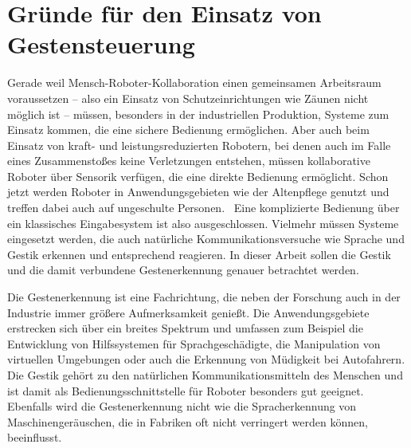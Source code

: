 \section{Gründe für den Einsatz von Gestensteuerung}
Gerade weil Mensch-Roboter-Kollaboration einen gemeinsamen Arbeitsraum voraussetzen -- also ein Einsatz von Schutzeinrichtungen wie Zäunen nicht möglich ist -- müssen, besonders in der industriellen Produktion, Systeme zum Einsatz kommen, die eine sichere Bedienung ermöglichen. Aber auch beim Einsatz von kraft- und leistungsreduzierten Robotern, bei denen auch im Falle eines Zusammenstoßes keine Verletzungen entstehen, müssen kollaborative Roboter über Sensorik verfügen, die eine direkte Bedienung ermöglicht. Schon jetzt werden Roboter in Anwendungsgebieten wie der Altenpflege genutzt und treffen dabei auch auf ungeschulte Personen.~\cite{fraunhoferMRK} Eine komplizierte Bedienung über ein klassisches Eingabesystem ist also ausgeschlossen. Vielmehr müssen Systeme eingesetzt werden, die auch natürliche Kommunikationsversuche wie Sprache und Gestik erkennen und entsprechend reagieren. In dieser Arbeit sollen die Gestik und die damit verbundene Gestenerkennung genauer betrachtet werden.

Die Gestenerkennung ist eine Fachrichtung, die neben der Forschung auch in der Industrie immer größere Aufmerksamkeit genießt. Die Anwendungsgebiete erstrecken sich über ein breites Spektrum und umfassen zum Beispiel die Entwicklung von Hilfssystemen für Sprachgeschädigte, die Manipulation von virtuellen Umgebungen oder auch die Erkennung von Müdigkeit bei Autofahrern. Die Gestik gehört zu den natürlichen Kommunikationsmitteln des Menschen und ist damit als Bedienungsschnittstelle für Roboter besonders gut geeignet. Ebenfalls wird die Gestenerkennung nicht wie die Spracherkennung von Maschinengeräuschen, die in Fabriken oft nicht verringert werden können, beeinflusst.